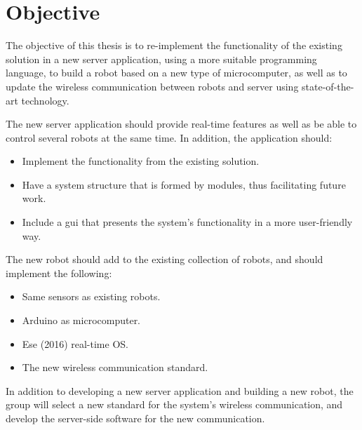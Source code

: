 \section{Objective}
The objective of this thesis is to re-implement the functionality of the existing solution in a new server application, using a more suitable programming language, to build a robot based on a new type of microcomputer, as well as to update the wireless communication between robots and server using state-of-the-art technology. 

The new server application should provide real-time features as well as be able to control several robots at the same time. In addition, the application should:
\begin{itemize}
    \item Implement the functionality from the existing solution.
    \item Have a system structure that is formed by modules, thus facilitating future work.
    \item Include a \acrlong{gui} that presents the system's functionality in a more user-friendly way.
\end{itemize}

The new robot should add to the existing collection of robots, and should implement the following:
\begin{itemize}
    \item Same sensors as existing robots.
    \item Arduino as microcomputer.
    \item Ese (2016) real-time OS.
    \item The new wireless communication standard.
\end{itemize}

In addition to developing a new server application and building a new robot, the group will select a new standard for the system's wireless communication, and develop the server-side software for the new communication.